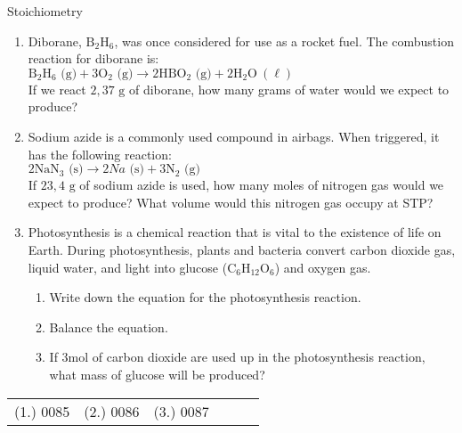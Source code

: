     \noindent
            \begin{exercises}{  Stoichiometry
      }
            \nopagebreak \noindent
      \label{m38712*id285393}\begin{enumerate}[noitemsep, label=\textbf{\arabic*}. ] 
            \label{m38712*uid101}\item Diborane, $\text{B}{}_{2}\text{H}{}_{6}$, was once considered for use as a rocket fuel. The combustion reaction for diborane is:\\
${\text{B}}_{2}{\text{H}}_{6} \text{ (g)} + 3{\text{O}}_{2} \text{ (g)} \to 2\text{H}\text{B}{\text{O}}_{2} \text{ (g)} + 2{\text{H}}_{2}\text{O} ~\left( \ell \right)$\\
If we react $2,37 \text{ g}$ of diborane, how many grams of water would we expect to produce?
\item Sodium azide is a commonly used compound in airbags. When triggered, it has the following reaction:\\
$2{\text{NaN}}_{3} \text{ (s)} \to 2Na \text{ (s)} + 3{\text{N}}_{2} \text{ (g)}$\\
If $23,4 \text{ g}$ of sodium azide is used, how many moles of nitrogen gas would we expect to produce? What volume would this nitrogen gas occupy at STP?\newline
\label{m38712*uid103}\item Photosynthesis is a chemical reaction that is vital to the existence of life on Earth. During photosynthesis, plants and bacteria convert carbon dioxide gas, liquid water, and light into glucose ($\text{C}{}_{6}\text{H}{}_{12}\text{O}{}_{6}$) and oxygen gas.
\label{m38712*id285674}\begin{enumerate}[noitemsep, label=\textbf{\alph*}. ] 
            \label{m38712*uid104}\item Write down the equation for the photosynthesis reaction.
\label{m38712*uid105}\item Balance the equation.
\label{m38712*uid106}\item If $3 \text{mol}$ of carbon dioxide are used up in the photosynthesis reaction, what mass of glucose will be produced?
\end{enumerate}
                \end{enumerate}
\practiceinfo
\par 
 \par \begin{tabular}[h]{cccccc}
 (1.) 0085  &  (2.) 0086  &  (3.) 0087  & \end{tabular}
\end{exercises}

